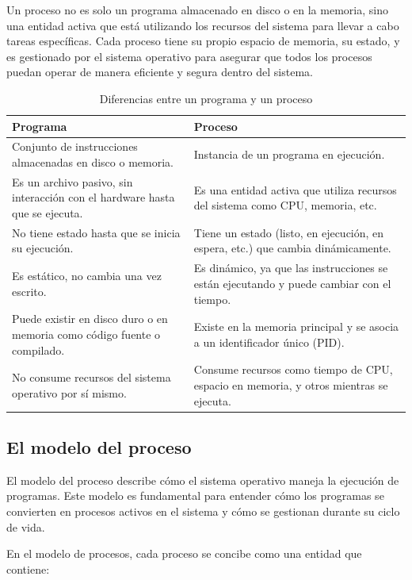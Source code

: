 Un proceso no es solo un programa almacenado en disco o en la memoria, sino una entidad activa que está utilizando los recursos del sistema para llevar a cabo tareas específicas. Cada proceso tiene su propio espacio de memoria, su estado, y es gestionado por el sistema operativo para asegurar que todos los procesos puedan operar de manera eficiente y segura dentro del sistema.
\begin{table}[H]
	\centering
	\begin{tabularx}{0.9\textwidth}{|X|X|}
		\hline
		\textbf{Programa} & \textbf{Proceso} \\ \hline
		Conjunto de instrucciones almacenadas en disco o memoria. & Instancia de un programa en ejecución. \\ \hline
		Es un archivo pasivo, sin interacción con el hardware hasta que se ejecuta. & Es una entidad activa que utiliza recursos del sistema como CPU, memoria, etc. \\ \hline
		No tiene estado hasta que se inicia su ejecución. & Tiene un estado (listo, en ejecución, en espera, etc.) que cambia dinámicamente. \\ \hline
		Es estático, no cambia una vez escrito. & Es dinámico, ya que las instrucciones se están ejecutando y puede cambiar con el tiempo. \\ \hline
		Puede existir en disco duro o en memoria como código fuente o compilado. & Existe en la memoria principal y se asocia a un identificador único (PID). \\ \hline
		No consume recursos del sistema operativo por sí mismo. & Consume recursos como tiempo de CPU, espacio en memoria, y otros mientras se ejecuta. \\ \hline
	\end{tabularx}
	\caption{Diferencias entre un programa y un proceso}
	\label{tabla_programa_proceso}
\end{table}
\subsection{El modelo del proceso}

El modelo del proceso describe cómo el sistema operativo maneja la ejecución de programas. Este modelo es fundamental para entender cómo los programas se convierten en procesos activos en el sistema y cómo se gestionan durante su ciclo de vida.

En el modelo de procesos, cada proceso se concibe como una entidad que contiene:

